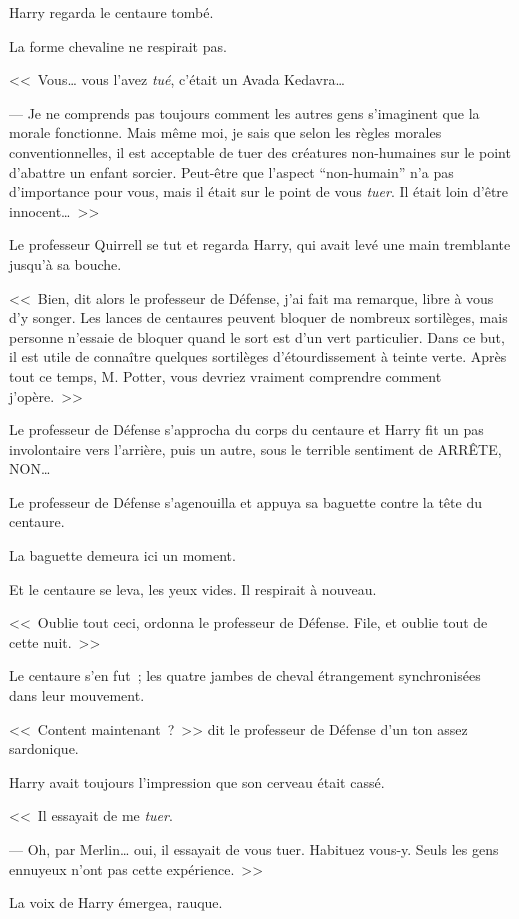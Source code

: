Harry regarda le centaure tombé.

La forme chevaline ne respirait pas.

<<~Vous… vous l'avez \emph{tué}, c'était un Avada Kedavra…

--- Je ne comprends pas toujours comment les autres gens s'imaginent que la morale fonctionne. Mais même moi, je sais que selon les règles morales conventionnelles, il est acceptable de tuer des créatures non-humaines sur le point d'abattre un enfant sorcier. Peut-être que l'aspect “non-humain” n'a pas d'importance pour vous, mais il était sur le point de vous \emph{tuer}. Il était loin d'être innocent…~>>

Le professeur Quirrell se tut et regarda Harry, qui avait levé une main tremblante jusqu'à sa bouche.

<<~Bien, dit alors le professeur de Défense, j'ai fait ma remarque, libre à vous d'y songer. Les lances de centaures peuvent bloquer de nombreux sortilèges, mais personne n'essaie de bloquer quand le sort est d'un vert particulier. Dans ce but, il est utile de connaître quelques sortilèges d'étourdissement à teinte verte. Après tout ce temps, M. Potter, vous devriez vraiment comprendre comment j'opère.~>>

Le professeur de Défense s'approcha du corps du centaure et Harry fit un pas involontaire vers l'arrière, puis un autre, sous le terrible sentiment de ARRÊTE, NON…

Le professeur de Défense s'agenouilla et appuya sa baguette contre la tête du centaure.

La baguette demeura ici un moment.

Et le centaure se leva, les yeux vides. Il respirait à nouveau.

<<~Oublie tout ceci, ordonna le professeur de Défense. File, et oublie tout de cette nuit.~>>

Le centaure s'en fut~; les quatre jambes de cheval étrangement synchronisées dans leur mouvement.

<<~Content maintenant~?~>> dit le professeur de Défense d'un ton assez sardonique.

Harry avait toujours l'impression que son cerveau était cassé.

<<~Il essayait de me \emph{tuer}.

--- Oh, par Merlin… oui, il essayait de vous tuer. Habituez vous-y. Seuls les gens ennuyeux n'ont pas cette expérience.~>>

La voix de Harry émergea, rauque.

